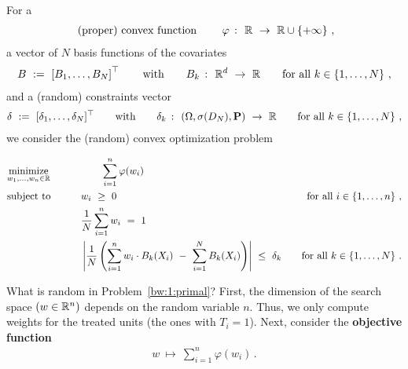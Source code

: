 For a 
\begin{align*}
  \text{
(proper) convex function
  }
  \qquad
  \varphi\ \colon\  \mathbb{R}\ \to\ \mathbb{R}\cup \left\{ +\infty \right\}
  \,,
\end{align*}
a vector of $N$ basis functions of the covariates 
\begin{gather*}
  B
  \ 
  :=
  \ 
  \left[ 
    B_1,\ldots,B_N
  \right]^\top
  \qquad
  \text{with}\qquad 
  B_k\ \colon\  \R^d\ \to\ \R
  \qquad
  \text{for all}\ k\in \left\{ 1,\ldots,N \right\}
  \,,
\end{gather*}
and a (random) constraints vector
\begin{align*}
\delta\ :=\ [\delta_1,\ldots,\delta_N]^\top
\qquad
  \text{with}\qquad 
  \delta_k\ \colon\  (\Omega,\sigma(D_N),\mathbf{P})\ \to\ \mathbb{R}
  \qquad
  \text{for all}\ k\in \left\{ 1,\ldots,N \right\}
  \,,
\end{align*}
we consider the (random) convex optimization problem
\newpage
\begin{fproblem}
  \label{bw:1:primal}
\begin{align*}
    &\underset{w_1, \ldots, w_n \in \R}
    {\text{minimize}}
    &&\qquad\qquad
    \sum_{i = 1}^{n} 
    \varphi(w_i)
    &&&
    \\
    &\text{subject to}
    &&\qquad
    w_i 
    \ 
    \ge
    \ 
    0
    &&&
    \text{for all}\ 
    i \in \left\{ 1, \ldots, n \right\}
    \,,
    \\
    & 
    &&
    \qquad
    \frac{1}{N}
    \sum_{i=1}^{n} 
    w_i
    \ 
    =
    \ 
    1
    \\
    & 
    &&\qquad
    \left| 
      \frac{1}{N} 
      \left( 
      \sum_{i = 1}^{n} 
      w_i
      \cdot
      B_k(X_i)
      \ 
      -
      \ 
      \sum_{i=1}^{N} 
      B_k(X_i)
      \right)
    \right|
    \ 
    \le 
    \ 
    \delta_k
    &&&
    \text{for all}\ 
    k \in \left\{ 1, \ldots, N \right\}
    \,.
\end{align*}
\end{fproblem}
What is random in Problem~\ref{bw:1:primal}?
First, the dimension of the search space $(w\in\mathbb{R}^n)$ depends on the random variable $n$. 
Thus, we only compute weights for the treated units (the ones with $T_i=1$).
Next, consider the \textbf{objective function}
\begin{gather*}
  w
  \ 
  \mapsto
  \ 
    \sum_{i = 1}^{n} 
    \varphi(w_i)
    \,.
\end{gather*}
